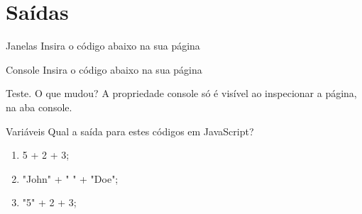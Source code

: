 \documentclass{beamer}
\begin{document}
\section{Saídas}
\begin{frame}{Janelas}
Insira o código abaixo na sua página
\begin{center}
	
\end{center}
	  
\end{frame}
\begin{frame}{Console}
Insira o código abaixo na sua página
\begin{center}
	
\end{center}
Teste. O que mudou?
\pause A propriedade console só é visível ao inspecionar a página, na aba 
console.
\cite{wschool2018js}
	  
\end{frame}
\begin{frame}{Variáveis}
 Qual a saída para estes códigos em JavaScript?
 \begin{enumerate}
   \item 5 + 2 + 3;
 	\item "John" + " " + "Doe";
 	\item "5" + 2 + 3;
 \end{enumerate} 	
 \end{frame}

\end{document}
